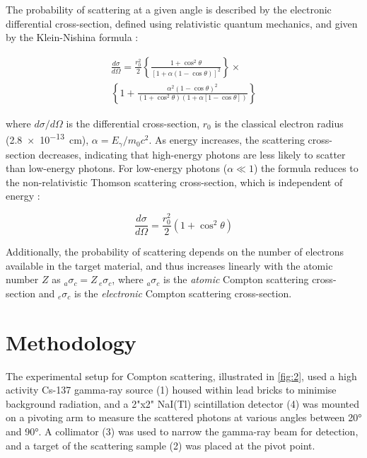 \documentclass[11pt, a4paper, twocolumn]{article}
\begin{document}
The probability of scattering at a given angle is described by the electronic differential cross-section, defined using relativistic quantum mechanics, and given by the Klein-Nishina formula \cite{UCD_PHYC30090_Part3,UCD_comptonlab,knoll2010radiation,rybicki2024radiative,PRATT2010124,cryst11050525}:

\begin{multline} \label{eq:3}
  \frac{d\sigma}{d\Omega} = \frac{r_0^2}{2} \left\{ \frac{1+\cos^2\theta}{[1+\alpha(1-\cos\theta)]^2} \right\} \times \\
  \left\{ 1 + \frac{\alpha^2(1-\cos\theta)^2}{(1+\cos^2\theta)(1+\alpha[1-\cos\theta])} \right\}
\end{multline}

where $d\sigma/d\Omega$ is the differential cross-section, $r_0$ is the classical electron radius (\qty{2.8e-13}{cm}), $\alpha = E_{\gamma}/m_0c^2$. As energy increases, the scattering cross-section decreases, indicating that high-energy photons are less likely to scatter than low-energy photons. For low-energy photons ($\alpha \ll 1$) the formula reduces to the non-relativistic Thomson scattering cross-section, which is independent of energy \cite{UCD_PHYC30090_Part3,rybicki2024radiative,cryst11050525,PRATT2010124}:

\begin{equation}
  \frac{d\sigma}{d\Omega} = \frac{r_0^2}{2}(1+\cos^2\theta)
\end{equation}

Additionally, the probability of scattering depends on the number of electrons available in the target material, and thus increases linearly with the atomic number $Z$ as ${}_a\sigma_c = Z\, {}_e\sigma_c$, where ${}_a\sigma_c$ is the \textit{atomic} Compton scattering cross-section and ${}_e\sigma_c$ is the \textit{electronic} Compton scattering cross-section. \cite{UCD_PHYC30090_Part3,knoll2010radiation}

\section{Methodology} \label{sec:3}

The experimental setup for Compton scattering, illustrated in \autoref{fig:2}, used a high activity Cs-137 gamma-ray source (1) housed within lead bricks to minimise background radiation, and a 2"x2" NaI(Tl) scintillation detector (4) was mounted on a pivoting arm to measure the scattered photons at various angles between 20° and 90°. A collimator (3) was used to narrow the gamma-ray beam for detection, and a target of the scattering sample (2) was placed at the pivot point. 
\end{document}
